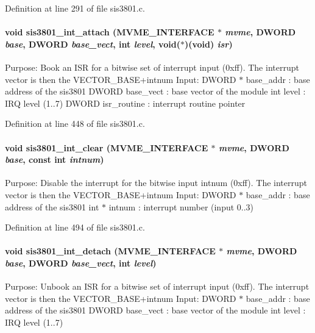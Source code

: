 Definition at line 291 of file sis3801.c.
\paragraph[{sis3801\_\-int\_\-attach}]{\setlength{\rightskip}{0pt plus 5cm}void sis3801\_\-int\_\-attach ({\bf MVME\_\-INTERFACE} $\ast$ {\em mvme}, \/  {\bf DWORD} {\em base}, \/  {\bf DWORD} {\em base\_\-vect}, \/  int {\em level}, \/  void($\ast$)(void) {\em isr})}\hfill\label{sis3801_8h_a2b77796e1d3a01604babb9b8ad11621f}
Purpose: Book an ISR for a bitwise set of interrupt input (0xff). The interrupt vector is then the VECTOR\_\-BASE+intnum Input: DWORD $\ast$ base\_\-addr : base address of the sis3801 DWORD base\_\-vect : base vector of the module int level : IRQ level (1..7) DWORD isr\_\-routine : interrupt routine pointer 

Definition at line 448 of file sis3801.c.
\paragraph[{sis3801\_\-int\_\-clear}]{\setlength{\rightskip}{0pt plus 5cm}void sis3801\_\-int\_\-clear ({\bf MVME\_\-INTERFACE} $\ast$ {\em mvme}, \/  {\bf DWORD} {\em base}, \/  const int {\em intnum})}\hfill\label{sis3801_8h_af12722909e5d4125828c425b88015072}
Purpose: Disable the interrupt for the bitwise input intnum (0xff). The interrupt vector is then the VECTOR\_\-BASE+intnum Input: DWORD $\ast$ base\_\-addr : base address of the sis3801 int $\ast$ intnum : interrupt number (input 0..3) 

Definition at line 494 of file sis3801.c.
\paragraph[{sis3801\_\-int\_\-detach}]{\setlength{\rightskip}{0pt plus 5cm}void sis3801\_\-int\_\-detach ({\bf MVME\_\-INTERFACE} $\ast$ {\em mvme}, \/  {\bf DWORD} {\em base}, \/  {\bf DWORD} {\em base\_\-vect}, \/  int {\em level})}\hfill\label{sis3801_8h_aabfff334589d256ec03c1f7e6bc7969b}
Purpose: Unbook an ISR for a bitwise set of interrupt input (0xff). The interrupt vector is then the VECTOR\_\-BASE+intnum Input: DWORD $\ast$ base\_\-addr : base address of the sis3801 DWORD base\_\-vect : base vector of the module int level : IRQ level (1..7) 

